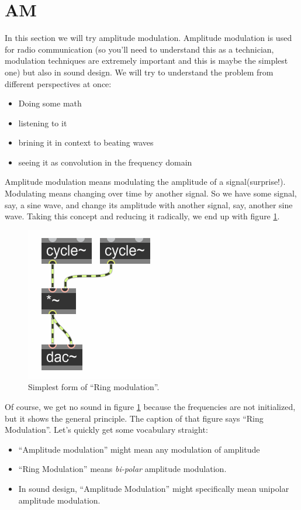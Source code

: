 \section{AM} %
\label{sub:AM}
In this section we will try amplitude modulation. Amplitude modulation is used for radio communication (so you'll need to understand this as a technician, modulation techniques are extremely important and this is maybe the simplest one) but also in sound design. We will try to understand the problem from different perspectives at once:
\begin{itemize}
	\item Doing some math
	\item listening to it
	\item brining it in context to beating waves
	\item seeing it as convolution in the frequency domain
\end{itemize}

Amplitude modulation means modulating the amplitude of a signal(surprise!). Modulating means changing over time by another signal. So we have some signal, say, a sine wave, and change its amplitude with another signal, say, another sine wave. Taking this concept and reducing it radically, we end up with figure \ref{fig:simpleAM}.

\begin{figure}[H]
	\begin{center}
		\includegraphics{img/ringNaive.png}
		\caption{Simplest form of ``Ring modulation''.}
		\label{fig:simpleAM}
	\end{center}
\end{figure}
Of course, we get no sound in figure \ref{fig:simpleAM} because the frequencies are not initialized, but it shows the general principle. The caption of that figure says ``Ring Modulation''. Let's quickly get some vocabulary straight:\\
\begin{itemize}
	\item ``Amplitude modulation'' might mean any modulation of amplitude
	\item ``Ring Modulation'' means \textit{bi-polar} amplitude modulation.
	\item In sound design, ``Amplitude Modulation'' might specifically mean unipolar amplitude modulation.
\end{itemize}

